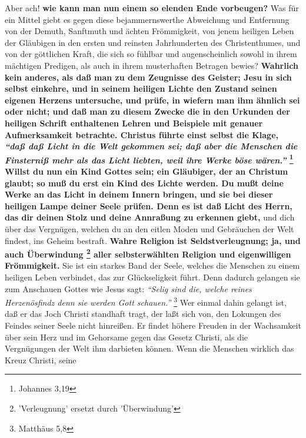 Aber ach! \textbf{wie kann man nun einem so elenden Ende vorbeugen?} Was für ein
Mittel
giebt es gegen diese bejammernswerthe Abweichung und Entfernung von der Demuth,
Sanftmuth und ächten Frömmigkeit, von jenem heiligen Leben der Gläubigen in den
ersten und reinsten Jahrhunderten des Christenthumes, und von der göttlichen
Kraft, die sich so fühlbar und augenscheinlich sowohl in ihrem mächtigen
Predigen, als auch in ihrem musterhaften Betragen bewies? \textbf{Wahrlich kein
anderes,
als daß man zu dem Zeugnisse des Geister; Jesu in sich
selbst einkehre, und in
seinem heiligen Lichte den Zustand seinen eigenen Herzens untersuche, und prüfe,
in wiefern man ihm ähnlich sei oder nicht; und daß man zu diesem Zwecke die in
den Urkunden der heiligen Schrift enthaltenen Lehren und
Beispiele mit genauer
Aufmerksamkeit betrachte. Christus führte einst selbst die Klage,
\textit{"`daß daß
Licht in die Welt gekommen sei; daß aber die Menschen die Finsterniß mehr als
das Licht liebten, weil ihre Werke böse wären."'}
\footnote{Johannes 3,19}
Willst du
nun ein Kind Gottes sein; ein Gläubiger, der an Christum
glaubt; so muß du erst
ein Kind des Lichte werden. Du mußt deine Werke an das
Licht in deinem Innern
bringen, und sie bei dieser heiligen Lampe deiner Seele prüfen. Denn es ist daß
Licht des Herrn, das dir deinen Stolz und deine Annraßung zu erkennen giebt,}
und
dich über das Vergnügen, welchen du an den eitlen Moden und
Gebräuchen der Welt
findest, ins Geheim bestraft. \textbf{Wahre Religion ist Seldstverleugnung; ja,
und auch
Überwindung \footnote{'Verleugnung' ersetzt durch 'Überwindung'} aller selbsterwählten Religion und eigenwilligen Frömmigkeit.} Sie
ist ein starkes Band der Seele, welches die Menschen zu einem heiligen Leben
verbindet, das zur Glückseligkeit führt. Denn dadurch gelangen sie zum Anschauen
Gottes wie Jesus sagt:
\textit{"`Selig sind die, welche reines Herzenösfindz denn sie
werden Gott schauen."'}
\footnote{Matthäus 5,8}
Wer einmal dahin gelangt ist, daß
er das Joch Christi standhaft tragt, der laßt sich von, den Lokungen des Feindes
seiner Seele nicht hinreißen. Er findet höhere Freuden in der Wachsamkeit über
sein Herz und im Gehorsame gegen das Gesetz Christi, als die Vergnügungen der
Welt ihm darbieten können. Wenn die Menschen wirklich das Kreuz Christi, seine
